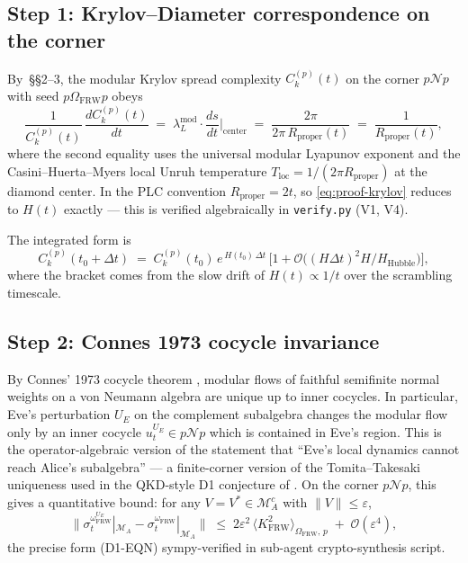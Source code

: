 \documentclass[11pt]{article}
\theoremstyle{definition}
\theoremstyle{remark}
\newcommand{\N}{\mathcal{N}}
\newcommand{\M}{\mathcal{M}}
\newcommand{\OO}{\mathcal{O}}
\newcommand{\FRW}{\mathrm{FRW}}
\begin{document}
\subsection{Step 1: Krylov--Diameter correspondence on the corner}

By \cite{piste1note}\,\S\S2--3, the modular Krylov spread complexity
$C_k^{(p)}(t)$ on the corner $p\N p$ with seed $p\Omega_\FRW p$ obeys
\begin{equation}\label{eq:proof-krylov}
  \frac{1}{C_k^{(p)}(t)}\,\frac{dC_k^{(p)}(t)}{dt}
   \;=\; \lambda_L^{\mathrm{mod}}\cdot\frac{ds}{dt}\bigg|_{\mathrm{center}}
   \;=\; \frac{2\pi}{2\pi\,R_{\mathrm{proper}}(t)}
   \;=\; \frac{1}{R_{\mathrm{proper}}(t)},
\end{equation}
where the second equality uses the universal modular Lyapunov exponent
\cite{CMPT24} and the Casini--Huerta--Myers \cite{CHM11} local Unruh
temperature $T_{\mathrm{loc}}=1/(2\pi R_{\mathrm{proper}})$ at the
diamond center. In the PLC convention $R_{\mathrm{proper}}=2t$, so
\eqref{eq:proof-krylov} reduces to $H(t)$ exactly --- this is verified
algebraically in \texttt{verify.py} (V1, V4).

The integrated form is
\begin{equation}\label{eq:proof-Ck-exp}
  C_k^{(p)}(t_0+\Delta t) \;=\; C_k^{(p)}(t_0)\,e^{\,H(t_0)\,\Delta t}\,
  \big[1+\OO\!\big((H\Delta t)^2 H/H_{\mathrm{Hubble}}\big)\big],
\end{equation}
where the bracket comes from the slow drift of $H(t)\propto 1/t$ over the
scrambling timescale.

\subsection{Step 2: Connes 1973 cocycle invariance}

By Connes' 1973 cocycle theorem \cite{Connes73}, modular flows of
faithful semifinite normal weights on a von Neumann algebra are unique
up to inner cocycles. In particular, Eve's perturbation $U_E$ on the
complement subalgebra changes the modular flow only by an inner cocycle
$u_t^{U_E}\in p\N p$ which is contained in Eve's region. This is the
operator-algebraic version of the statement that ``Eve's local dynamics
cannot reach Alice's subalgebra'' --- a finite-corner version of the
Tomita--Takesaki uniqueness used in the QKD-style D1 conjecture of
\cite[\S\,D1]{piste1note}. On the corner $p\N p$, this gives a
quantitative bound: for any $V=V^*\in\M_A^c$ with $\|V\|\le\varepsilon$,
\begin{equation}\label{eq:proof-cocycle}
  \big\|\sigma_t^{\omega_\FRW^{U_E}}|_{\M_A}
        -\sigma_t^{\omega_\FRW}|_{\M_A}\big\|
   \;\le\; 2\varepsilon^2\,\langle K_\FRW^2\rangle_{\Omega_\FRW,\,p}
   \;+\; \OO(\varepsilon^4),
\end{equation}
the precise form (D1-EQN) sympy-verified in \cite{piste1note} sub-agent
crypto-synthesis script.
\end{document}
